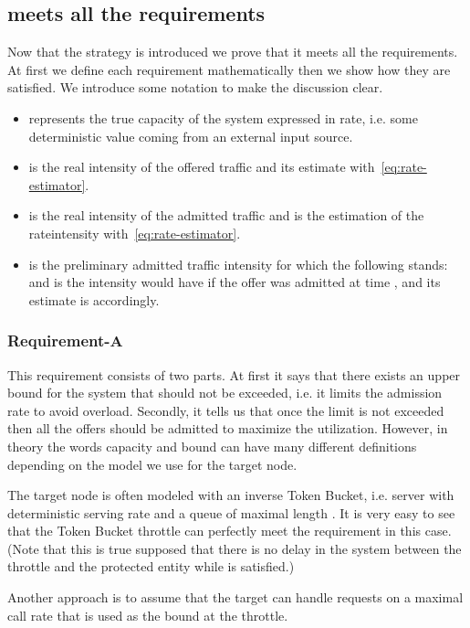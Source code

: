 \documentclass[conference]{IEEEtran}
\begin{document}
\subsection{ meets all the
requirements}\label{section:g-meets-the-requirements} Now that the
strategy is introduced we prove that it meets all the requirements.
At first we define each requirement mathematically then we show how
they are satisfied. We introduce some notation to make the
discussion clear.
\begin{itemize}
 \item  represents the true capacity of the system expressed in rate, i.e. some
 deterministic value coming from an external input source.
 \item  is the real intensity of the offered traffic and  its
 estimate with~\eqref{eq:rate-estimator}.
 \item  is the real intensity of the admitted traffic and
  is the estimation of the rateintensity with~\eqref{eq:rate-estimator}.
 \item  is the preliminary admitted traffic intensity for which
 the following stands:  and
  is the intensity  would have if the offer was
 admitted at time , and its estimate is 
 accordingly.
\end{itemize}

\subsubsection{Requirement-A\ }
This requirement consists of two parts. At first it says that there
exists an upper bound for the system that should not be exceeded,
i.e. it limits the admission rate to avoid overload. Secondly, it
tells us that once the limit is not exceeded then all the offers
should be admitted to maximize the utilization. However, in theory
the words capacity and bound can have many different definitions
depending on the model we use for the target node.

The target node is often modeled with an inverse Token Bucket, i.e.
server with deterministic serving rate  and a queue of maximal
length . It is very easy to see that the Token Bucket throttle
 can perfectly meet the requirement in this case.
(Note that this is true supposed that there is no delay in the
system between the throttle and the protected entity while
 is satisfied.)

Another approach is to assume that the target can handle requests on
a maximal call rate  that is used as the bound at the throttle.
\end{document}
